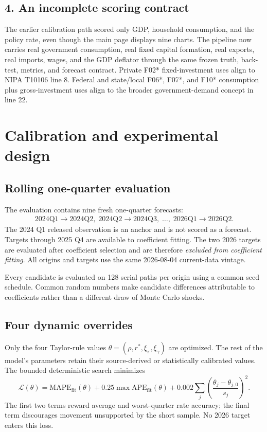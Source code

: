 \documentclass[10pt]{article}
\begin{document}
\subsection{4. An incomplete scoring contract}

The earlier calibration path scored only GDP, household consumption, and the
policy rate, even though the main page displays nine charts. The pipeline now
carries real government consumption, real fixed capital formation, real
exports, real imports, wages, and the GDP deflator through the same frozen
truth, back-test, metrics, and forecast contract. Private F02* fixed-investment
uses align to NIPA T10106 line 8. Federal and state/local F06*, F07*, and F10*
consumption plus gross-investment uses align to the broader government-demand
concept in line 22.

\section{Calibration and experimental design}

\subsection{Rolling one-quarter evaluation}

The evaluation contains nine fresh one-quarter forecasts:
\[
\begin{array}{c}
2024\mathrm{Q1}\!\rightarrow\!2024\mathrm{Q2},\;
2024\mathrm{Q2}\!\rightarrow\!2024\mathrm{Q3},\;\ldots,\;
2026\mathrm{Q1}\!\rightarrow\!2026\mathrm{Q2}.
\end{array}
\]
The 2024 Q1 released observation is an anchor and is not scored as a forecast.
Targets through 2025 Q4 are available to coefficient fitting. The two 2026
targets are evaluated after coefficient selection and are therefore
\emph{excluded from coefficient fitting}. All origins and targets use the same
2026-08-04 current-data vintage.

Every candidate is evaluated on 128 serial paths per origin using a common
seed schedule. Common random numbers make candidate differences attributable
to coefficients rather than a different draw of Monte Carlo shocks.

\subsection{Four dynamic overrides}

Only the four Taylor-rule values
\(\theta=(\rho,r^*,\xi_\pi,\xi_\gamma)\) are optimized. The rest of the model's
parameters retain their source-derived or statistically calibrated values.
The bounded deterministic search minimizes
\[
\mathcal L(\theta)=
\mathrm{MAPE}_{\mathrm{fit}}(\theta)
+0.25\max\mathrm{APE}_{\mathrm{fit}}(\theta)
+0.002\sum_j\left(\frac{\theta_j-\theta_{j,0}}{s_j}\right)^2.
\]
The first two terms reward average and worst-quarter rate accuracy; the final
term discourages movement unsupported by the short sample. No 2026 target
enters this loss.
\end{document}
